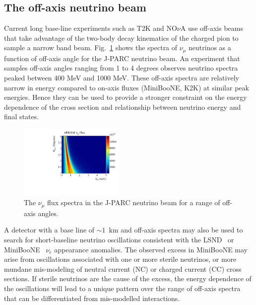 \subsection{The off-axis neutrino beam}
Current long base-line experiments such as T2K and NO$\nu$A use off-axis beams that take advantage of the two-body
decay kinematics of the charged pion to sample a narrow band beam.  Fig.~\ref{fig:off-axis} shows the spectra of $\nu_{\mu}$ 
neutrinos as a function of off-axis angle for the J-PARC neutrino beam.  An experiment that samples off-axis angles ranging
from 1 to 4 degrees observes neutrino spectra peaked between 400 MeV and 1000 MeV.  These off-axis spectra are relatively 
narrow in energy compared to on-axis fluxes (MiniBooNE, K2K) at similar peak energies.  Hence they can be used to provide
a stronger constraint on the energy dependence of the cross section and relationship between neutrino energy and 
final states.  

\begin{figure}
 \begin{center}
  \includegraphics[width=0.45\textwidth]{figures/nuprism_oa_enu_numu.pdf}
  \caption{The $\nu_{\mu}$ flux spectra in the J-PARC neutrino beam for a range of off-axis angles.}
  \label{fig:off-axis}
  \end{center}
\end{figure}

A detector with a base line of $\sim1$~km and off-axis spectra may also be used to search for short-baseline neutrino oscillations
consistent with the LSND~\cite{Athanassopoulos:1996jb} or MiniBooNE~\cite{Aguilar-Arevalo:2013pmq} $\nu_{e}$ appearance anomalies.  
The observed excess in MiniBooNE may arise from 
oscillations associated with one or more sterile neutrinos, or more mundane mis-modeling of neutral current (NC) or charged current (CC) 
cross sections.  If sterile neutrinos are the cause of the excess, the energy dependence of the oscillations will lead to a 
unique pattern over the range of off-axis spectra that can be differentiated from mis-modelled interactions.


